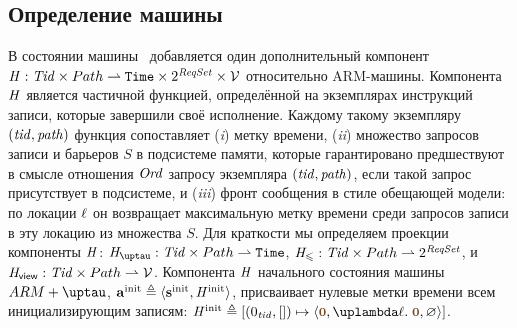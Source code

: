 \subsection{Определение машины \ARMt}
В состоянии машины \ARMt~добавляется один дополнительный компонент 
$\mathit{H} : \mathit{Tid} \times Path \rightharpoonup \mathtt{Time} \times 2^{\mathit{ReqSet}} \times \mathcal{V}$
относительно ARM-машины.
Компонента $\mathit{H}$ является частичной функцией, определённой на экземплярах инструкций
записи, которые завершили своё исполнение.
Каждому такому экземпляру $(\mathit{tid}, \mathit{path})$ функция сопоставляет
(\emph{i}) метку времени,
(\emph{ii}) множество запросов записи и барьеров $S$ в подсистеме памяти,
которые гарантировано предшествуют в смысле отношения $\mathit{Ord}$ запросу экземпляра $(\mathit{tid}, \mathit{path})$,
если такой запрос присутствует в подсистеме,
и (\emph{iii}) фронт сообщения в стиле обещающей модели:
по локации $\ell$ он возвращает максимальную метку времени среди запросов записи
в эту локацию из множества $S$.
Для краткости мы определяем проекции компоненты $\mathit{H}$:
$\tmap: \Tid \times \Path \rightharpoonup \Timestamp$,
$\mathit{H}_{\leqslant}: \mathit{Tid} \times Path \rightharpoonup 2^{\mathit{ReqSet}}$, и
$\mathit{H}_{\mathsf{view}}: \mathit{Tid} \times Path \rightharpoonup \mathcal{V}$.
Компонента $\mathit{H}$ начального состояния машины $\ARMt$,
$\mathbf{a}^{\rm init} \triangleq \langle \mathbf{s}^{\rm init}, \mathit{H}^{\rm init} \rangle$,
присваивает нулевые метки времени всем инициализирующим записям:
$\hmap^{\rm init} \triangleq [(0_{\tId}, []) \mapsto
  \angled{\tstamp{0}, \lambda \loc. \; \tstamp{0}, \emptyset}]$.

